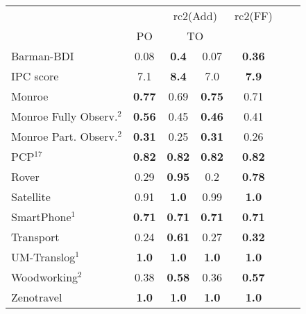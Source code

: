 \begin{tabular}{lccccccl} 
\toprule 
  && \multicolumn{2}{c}{rc2(Add)} & \multicolumn{2}{c}{rc2(FF)} \\ 
\cmidrule(lr){3-4} \cmidrule(lr){5-6}  
 &PO &\multicolumn{2}{c}{ TO  } \\ 
\midrule 
Barman-BDI & 0.08 & \textbf{0.4} & 0.07 &\multicolumn{2}{c}{ \textbf{0.36}  } \\ 
\midrule 
 IPC score & 7.1 & \textbf{8.4} & 7.0 &\multicolumn{2}{c}{ \textbf{7.9}  } \\ 
\midrule 
 Monroe & \textbf{0.77} & 0.69 & \textbf{0.75} &\multicolumn{2}{c}{ 0.71  } \\ 
Monroe Fully Observ.$^{2}$ & \textbf{0.56} & 0.45 & \textbf{0.46} &\multicolumn{2}{c}{ 0.41  } \\ 
Monroe Part. Observ.$^{2}$ & \textbf{0.31} & 0.25 & \textbf{0.31} &\multicolumn{2}{c}{ 0.26  } \\ 
PCP$^{17}$ & \textbf{0.82} & \textbf{0.82} & \textbf{0.82} &\multicolumn{2}{c}{ \textbf{0.82}  } \\ 
Rover & 0.29 & \textbf{0.95} & 0.2 &\multicolumn{2}{c}{ \textbf{0.78}  } \\ 
Satellite & 0.91 & \textbf{1.0} & 0.99 &\multicolumn{2}{c}{ \textbf{1.0}  } \\ 
SmartPhone$^{1}$ & \textbf{0.71} & \textbf{0.71} & \textbf{0.71} &\multicolumn{2}{c}{ \textbf{0.71}  } \\ 
Transport & 0.24 & \textbf{0.61} & 0.27 &\multicolumn{2}{c}{ \textbf{0.32}  } \\ 
UM-Translog$^{1}$ & \textbf{1.0} & \textbf{1.0} & \textbf{1.0} &\multicolumn{2}{c}{ \textbf{1.0}  } \\ 
Woodworking$^{2}$ & 0.38 & \textbf{0.58} & 0.36 &\multicolumn{2}{c}{ \textbf{0.57}  } \\ 
Zenotravel & \textbf{1.0} & \textbf{1.0} & \textbf{1.0} &\multicolumn{2}{c}{ \textbf{1.0}  } \\ 
\bottomrule 
 \end{tabular} 
